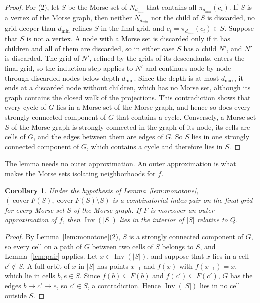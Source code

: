 \documentclass[11pt]{article}
\theoremstyle{plain}
\newtheorem{corollary}[proposition]{Corollary}
\theoremstyle{definition}
\theoremstyle{remark}
\DeclareMathOperator{\Inv}{Inv}
\DeclareMathOperator{\cover}{cover}
\newcommand{\dmin}{d_{\min}}
\newcommand{\dmax}{d_{\max}}
\begin{document}
\begin{proof}
For (2), let $S$ be the Morse set of $N_{\dmin}$ that contains all $\pi_{\dmin}(c_i)$. If $S$ is a vertex of the Morse graph, then neither $N_{\dmin}$ nor the child of $S$ is discarded, no grid deeper than $\dmin$ refines $S$ in the final grid, and $c_i=\pi_{\dmin}(c_i)\in S$. Suppose that $S$ is not a vertex. A node with a Morse set is discarded only if it has children and all of them are discarded, so in either case $S$ has a child $N'$, and $N'$ is discarded. The grid of $N'$, refined by the grids of its descendants, enters the final grid, so the induction step applies to $N'$ and continues node by node through discarded nodes below depth $\dmin$. Since the depth is at most $\dmax$, it ends at a discarded node without children, which has no Morse set, although its graph contains the closed walk of the projections. This contradiction shows that every cycle of $G$ lies in a Morse set of the Morse graph, and hence so does every strongly connected component of $G$ that contains a cycle. Conversely, a Morse set $S$ of the Morse graph is strongly connected in the graph of its node, its cells are cells of $G$, and the edges between them are edges of $G$. So $S$ lies in one strongly connected component of $G$, which contains a cycle and therefore lies in $S$.
\end{proof}

The lemma needs no outer approximation. An outer approximation is what makes the Morse sets isolating neighborhoods for $f$.

\begin{corollary}\label{cor:outer}
Under the hypothesis of Lemma~\ref{lem:monotone}, $(\cover F(S),\cover F(S)\setminus S)$ is a combinatorial index pair on the final grid for every Morse set $S$ of the Morse graph. If $F$ is moreover an outer approximation of $f$, then $\Inv(|S|)$ lies in the interior of $|S|$ relative to $Q$.
\end{corollary}

\begin{proof}
By Lemma~\ref{lem:monotone}(2), $S$ is a strongly connected component of $G$, so every cell on a path of $G$ between two cells of $S$ belongs to $S$, and Lemma~\ref{lem:pair} applies. Let $x\in\Inv(|S|)$, and suppose that $x$ lies in a cell $c'\notin S$. A full orbit of $x$ in $|S|$ has points $x_{-1}$ and $f(x)$ with $f(x_{-1})=x$, which lie in cells $b,e\in S$. Since $f(b)\subseteq F(b)$ and $f(c')\subseteq F(c')$, $G$ has the edges $b\to c'\to e$, so $c'\in S$, a contradiction. Hence $\Inv(|S|)$ lies in no cell outside $S$.
\end{proof}
\end{document}
